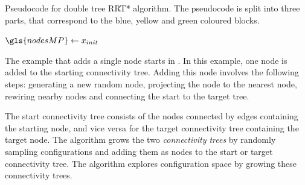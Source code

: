 \begin{algorithm}[H]
\caption{Pseudocode for double tree \ac{RRT*} algorithm. The pseudocode is split into three parts,  that correspond to the blue, yellow and green coloured blocks.}%
\label{pseudocode:proposed_rrt_star_all}%
\begin{algorithmic}[1]

\hspace{-0.9cm}\colorbox{my_grey}{\parbox{\linewidth}{%
\State $\gls{nodesMP} \leftarrow x_{init}$

\hspace{-0.1cm}\colorbox{my_light_blue}{\parbox{\linewidth}{%
}}

\hspace{-0.1cm}\colorbox{my_yellow}{\parbox{\linewidth}{%
}}

\hspace{-0.1cm}\colorbox{my_green}{\parbox{\linewidth}{%
}}
\EndWhile
}}
\end{algorithmic}
\end{algorithm}

The example that adds a single node starts in . In this example, one node is added to the starting connectivity tree. Adding this node involves the following steps: generating a new random node, projecting the node to the nearest node, rewiring nearby nodes and connecting the start to the target tree.\bs

The start connectivity tree consists of the nodes connected by edges containing the starting node, and vice versa for the target connectivity tree containing the target node. The algorithm grows the two \textit{connectivity trees} by randomly sampling configurations and adding them as nodes to the start or target connectivity tree. The algorithm explores configuration space by growing these connectivity trees.\bs

